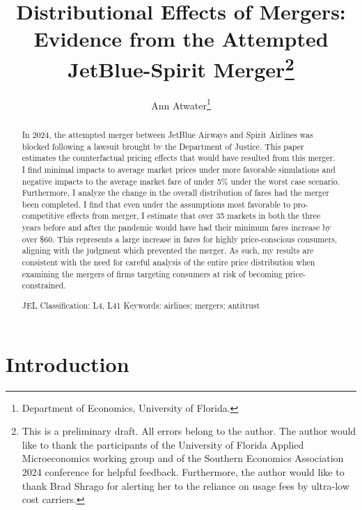 \documentclass{article}
\author{Ann Atwater\footnote{Department of Economics, University of Florida.}}
\title{Distributional Effects of Mergers: Evidence from the Attempted JetBlue-Spirit Merger\footnote{This is a preliminary draft. All errors belong to the author. The author would like to thank the participants of the University of Florida Applied Microeconomics working group and of the Southern Economics Association 2024 conference for helpful feedback. Furthermore, the author would like to thank Brad Shrago for alerting her to the reliance on usage fees by ultra-low cost carriers. }}
\begin{document}
	\maketitle
	
	\begin{abstract}
In 2024, the attempted merger between JetBlue Airways and Spirit Airlines was blocked following a lawsuit brought by the Department of Justice. This paper estimates the counterfactual pricing effects that would have resulted from this merger. I find minimal impacts to average market prices under more favorable simulations and negative impacts to the average market fare of under 5\% under the worst case scenario. Furthermore, I analyze the change in the overall distribution of fares had the merger been completed. I find that even under the assumptions most favorable to pro-competitive effects from merger, I estimate that over 35 markets in both the three years before and after the pandemic would have had their minimum fares increase by over \$60. This represents a large increase in fares for highly price-conscious consumers, aligning with the judgment which prevented the merger. As such, my results are consistent with the need for careful analysis of the entire price distribution when examining the mergers of firms targeting  consumers at risk of becoming price-constrained.  \bigskip

    \noindent JEL Classification: L4, L41 \newline
	\noindent Keywords: airlines; mergers; antitrust
		
	\end{abstract}
	
	\pagebreak
	
	\doublespacing
	
	\section{Introduction}
	\label{sec:Introduction} 
\end{document}
